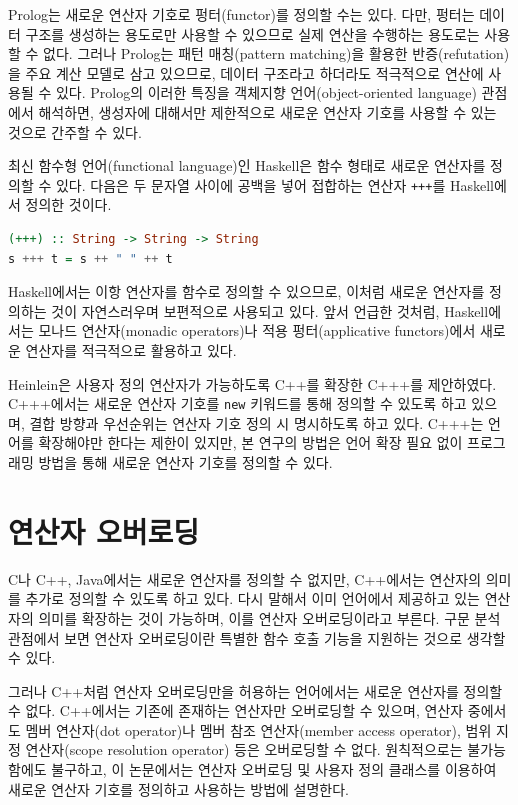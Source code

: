 \documentclass[titlepage]{pnureport}
\begin{document}
Prolog\cite{bratko11}는 새로운 연산자 기호로 펑터(functor)를 정의할 수는 있다. 다만, 펑터는 데이터 구조를 생성하는 용도로만 사용할 수 있으므로 실제 연산을 수행하는 용도로는 사용할 수 없다. 그러나 Prolog는 패턴 매칭(pattern matching)을 활용한 반증(refutation)을 주요 계산 모델로 삼고 있으므로, 데이터 구조라고 하더라도 적극적으로 연산에 사용될 수 있다. Prolog의 이러한 특징을 객체지향 언어(object-oriented language) 관점에서 해석하면, 생성자에 대해서만 제한적으로 새로운 연산자 기호를 사용할 수 있는 것으로 간주할 수 있다.

최신 함수형 언어(functional language)인 Haskell\cite{haskell10}은 함수 형태로 새로운 연산자를 정의할 수 있다. 다음은 두 문자열 사이에 공백을 넣어 접합하는 연산자 \verb|+++|를 Haskell에서 정의한 것이다.
\begin{lstlisting}[language=haskell]
(+++) :: String -> String -> String
s +++ t = s ++ " " ++ t
\end{lstlisting}
Haskell에서는 이항 연산자를 함수로 정의할 수 있으므로, 이처럼 새로운 연산자를 정의하는 것이 자연스러우며 보편적으로 사용되고 있다. 앞서 언급한 것처럼, Haskell에서는 모나드 연산자(monadic operators)나 적용 펑터(applicative functors)에서 새로운 연산자를 적극적으로 활용하고 있다.

Heinlein은 사용자 정의 연산자가 가능하도록 C++를 확장한 C+++를 제안하였다\cite{heinlein04}. C+++에서는 새로운 연산자 기호를 \texttt{new} 키워드를 통해 정의할 수 있도록 하고 있으며, 결합 방향과 우선순위는 연산자 기호 정의 시 명시하도록 하고 있다. C+++는 언어를 확장해야만 한다는 제한이 있지만, 본 연구의 방법은 언어 확장 필요 없이 프로그래밍 방법을 통해 새로운 연산자 기호를 정의할 수 있다.

\section{연산자 오버로딩}
C나 C++, Java에서는 새로운 연산자를 정의할 수 없지만, C++에서는 연산자의 의미를 추가로 정의할 수 있도록 하고 있다. 다시 말해서 이미 언어에서 제공하고 있는 연산자의 의미를 확장하는 것이 가능하며, 이를 연산자 오버로딩이라고 부른다. 구문 분석 관점에서 보면 연산자 오버로딩이란 특별한 함수 호출 기능을 지원하는 것으로 생각할 수 있다.

그러나 C++처럼 연산자 오버로딩만을 허용하는 언어에서는 새로운 연산자를 정의할 수 없다. C++에서는 기존에 존재하는 연산자만 오버로딩할 수 있으며, 연산자 중에서도 멤버 연산자(dot operator)나 멤버 참조 연산자(member access operator), 범위 지정 연산자(scope resolution operator) 등은 오버로딩할 수 없다. 원칙적으로는 불가능함에도 불구하고, 이 논문에서는 연산자 오버로딩 및 사용자 정의 클래스를 이용하여 새로운 연산자 기호를 정의하고 사용하는 방법에 설명한다.
\end{document}
